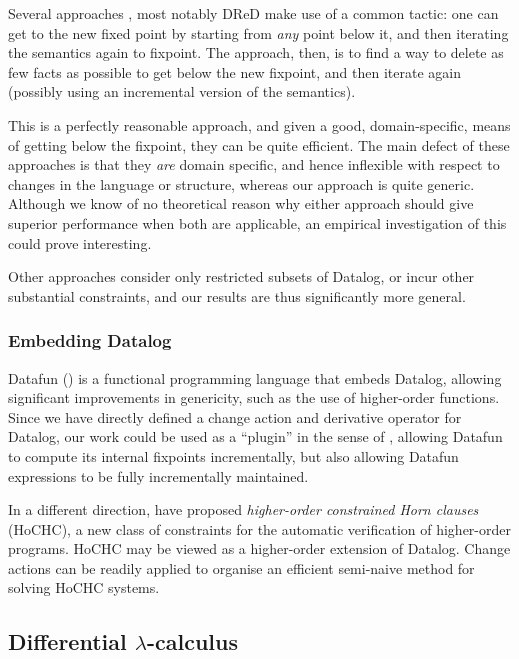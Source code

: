 Several approaches
\autocites{gupta1993maintaining}{harrison1992maintenance}, most notably DReD
make use of a common tactic: one can get to the new fixed
point by starting from \emph{any} point below it, and then iterating the
semantics again to fixpoint. The approach, then, is to find a way to delete as
few facts as possible to get below the new fixpoint, and then iterate again
(possibly using an incremental version of the semantics).

This is a perfectly reasonable approach, and given a good, domain-specific,
means of getting below the fixpoint, they can be quite efficient.
The main defect of these approaches is that they \emph{are} domain specific,
and hence inflexible with respect to changes in the language or structure,
whereas our approach is quite generic. Although we know of no theoretical reason
why either approach should give superior performance when both are applicable,
an empirical investigation of this could prove interesting.

Other approaches \autocites{dong2000incremental}{urpi1992method} consider only
restricted subsets of Datalog, or incur other substantial constraints, and our results
are thus significantly more general.

\subsubsection{Embedding Datalog}
\label{sec:embeddingDatalog}

Datafun (\textcite{arntz2016datafun}) is a functional programming language that embeds
Datalog, allowing significant improvements in genericity, such as the use of
higher-order functions. Since we have directly defined a change action and
derivative operator for Datalog, our work could be used as a ``plugin'' in the sense
of \citeauthor{cai2014changes}, allowing Datafun to compute its internal fixpoints
incrementally, but also allowing Datafun expressions to be fully incrementally maintained.

In a different direction, \textcite{cathcartburn2018hochc} have proposed
\emph{higher-order constrained Horn clauses}
(HoCHC), a new class of constraints for the automatic verification of higher-order programs.
HoCHC may be viewed as a higher-order extension of Datalog. 
Change actions can be readily applied to organise an efficient semi-naive method for solving HoCHC systems.

\subsection{Differential $\lambda$-calculus}

